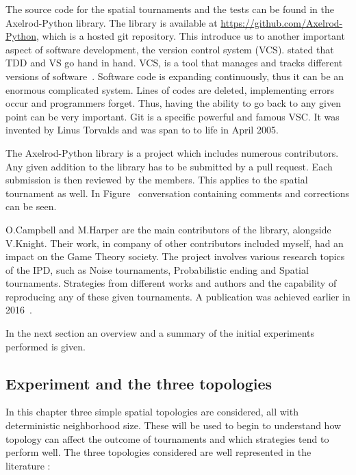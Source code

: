 The source code for the spatial tournaments and the tests can be found
in the Axelrod-Python library. The library is available at
\url{https://github.com/Axelrod-Python},
which is a hosted git repository. This introduce us to another important aspect
of software development, the version control system (VCS). \cite{Developer} stated
that TDD and VS go hand in hand. VCS, is a tool that manages and tracks different
versions of software~\cite{Vogel2014}. Software code is expanding continuously,
thus it can be an enormous
complicated system. Lines of codes are deleted, implementing errors occur and
programmers forget. Thus, having the ability to go back to any given point can be
very important. Git is a specific powerful and famous VSC. It was
invented by Linus Torvalds and was span to to life in April 2005.

The Axelrod-Python library is a project which includes numerous contributors.
Any given addition to the
library has to be submitted by a pull request. Each submission is then
reviewed by the members. This applies to the spatial tournament as well.
In Figure~ conversation containing comments and corrections can be seen.



O.Campbell and M.Harper are the main contributors of the library, alongside V.Knight.
Their work, in company of other contributors included myself, had an impact on
the Game Theory society. The project involves various research topics of
the IPD, such as Noise tournaments, Probabilistic ending and Spatial tournaments.
Strategies from different works and authors and the capability
of reproducing any of these given tournaments. A publication was achieved earlier
in 2016~\cite{Knight2016}.

In the next section an overview and a summary of the initial experiments
performed is given.


\subsection{Experiment and the three topologies}

In this chapter three simple spatial topologies are considered, all with
deterministic neighborhood size. These will be used to begin to understand how
topology can affect the outcome of tournaments
and which strategies tend to perform well. The three topologies considered are
well represented in the literature \cite{?}:

